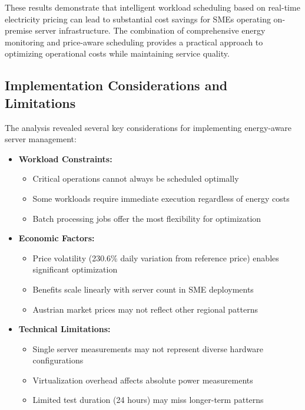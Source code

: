 These results demonstrate that intelligent workload scheduling based on real-time electricity 
pricing can lead to substantial cost savings for SMEs operating on-premise server infrastructure. 
The combination of comprehensive energy monitoring and price-aware scheduling provides a practical 
approach to optimizing operational costs while maintaining service quality.

\subsection{Implementation Considerations and Limitations}
\label{results:limitations}
The analysis revealed several key considerations for implementing energy-aware server management:

\begin{itemize}[noitemsep,topsep=0pt]
    \item \textbf{Workload Constraints:}
    \begin{itemize}[noitemsep]
        \item Critical operations cannot always be scheduled optimally
        \item Some workloads require immediate execution regardless of energy costs
        \item Batch processing jobs offer the most flexibility for optimization
    \end{itemize}
    
    \item \textbf{Economic Factors:}
    \begin{itemize}[noitemsep]
        \item Price volatility (230.6\%  daily variation from reference price) enables significant optimization
        \item Benefits scale linearly with server count in SME deployments
        \item Austrian market prices may not reflect other regional patterns
    \end{itemize}
    
    \item \textbf{Technical Limitations:}
    \begin{itemize}[noitemsep]
        \item Single server measurements may not represent diverse hardware configurations
        \item Virtualization overhead affects absolute power measurements
        \item Limited test duration (24 hours) may miss longer-term patterns
    \end{itemize}
\end{itemize}